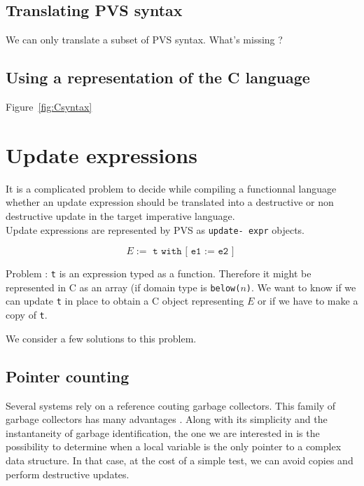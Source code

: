 \documentclass[12pt,a4paper,titlepage]{article}
\newcommand{\cl}[1]{\texttt{#1}}
\begin{document}
\subsection{Translating PVS syntax}


We can only translate a subset of PVS syntax.
What's missing ?



\subsection{Using a representation of the C language}

Figure~\ref{fig:Csyntax}








\section{Update expressions}


 It is a complicated problem to decide while compiling a functionnal language whether an update expression should be translated into a destructive or non destructive update in the target imperative language.\\

Update expressions are represented by PVS as \texttt{update-
expr} objects.

$$ E := \texttt{ t with [ e1 := e2 ] } $$

Problem :
\cl{t} is an expression typed as a function. Therefore it might be represented in C as an array (if domain type is \cl{below($n$)}.
We want to know if we can update \cl{t} in place to obtain a C object representing $E$ or if we have to make a copy of \cl{t}.


We consider a few solutions to this problem.


\subsection{Pointer counting}

Several systems rely on a reference couting garbage collectors. This family of garbage collectors has many advantages \cite{jonesgarbage}. Along with its simplicity and the instantaneity of garbage identification, the one we are interested in is the possibility to determine when a local variable is the only pointer to a complex data structure. In that case, at the cost of a simple test, we can avoid copies and perform destructive updates. \\
\end{document}
